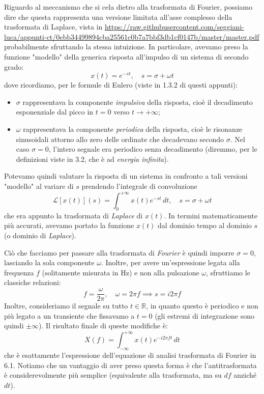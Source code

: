 \documentclass[a4paper,11pt]{article}
\begin{document}
\par\smallskip

Riguardo al meccanismo che si cela dietro alla trasformata di Fourier, possiamo dire che questa rappresenta una versione limitata all'asse complesso della trasformata di Laplace, vista in \url{https://raw.githubusercontent.com/seggiani-luca/appunti-ct/0ebb34499894cba25561c0b7a7bbf3db1cf0147b/master/master.pdf} probabilmente sfruttando la stessa intuizione. 
In particolare, avevamo preso la funzione "modello" della generica risposta all'impulso di un sistema di secondo grado:
$$
x(t) = e^{-st}, \quad s = \sigma + \omega t
$$
dove ricordiamo, per le formule di Eulero (viste in 1.3.2 di questi appunti):
\begin{itemize}
	\item $\sigma$ rappresentava la componente \textit{impulsiva} della risposta, cioè il decadimento esponenziale dal picco in $t = 0$ verso $t \rightarrow +\infty$;
	\item $\omega$ rappresentava la componente \textit{periodica} della risposta, cioè le risonanze sinusoidali attorno allo zero delle ordinate che decadevano secondo $\sigma$. Nel caso $\sigma = 0$, l'intero segnale era periodico senza decadimento (diremmo, per le definizioni viste in 3.2, che è ad \textit{energia infinita}).
\end{itemize}

Potevamo quindi valutare la risposta di un sistema in confronto a tali versioni "modello" al variare di $s$ prendendo l'integrale di convoluzione  
$$
\mathcal{L}[x(t)](s) = \int_0^{+\infty} x(t) e^{-st} \, dt, \quad s = \sigma + \omega t
$$
che era appunto la trasformata di \textit{Laplace} di $x(t)$. In termini matematicamente più accurati, avevamo portato la funzione $x(t)$ dal dominio tempo al dominio $s$ (o dominio di \textit{Laplace}).

Ciò che facciamo per passare alla trasformata di \textit{Fourier} è quindi imporre $\sigma = 0$, lasciando la sola componente $\omega$. Inoltre, per avere un'espressione legata alla frequenza $f$ (solitamente misurata in $\mathrm{Hz}$) e non alla pulsazione $\omega$, sfruttiamo le classiche relazioni:
$$
f = \frac{\omega}{2 \pi}, \quad \omega = 2 \pi f \implies s = i 2 \pi f
$$
Inoltre, consideriamo il segnale su tutto $t \in \mathbb{R}$, in quanto questo è periodico e non più legato a un transiente che fissavamo a $t = 0$ (gli estremi di integrazione sono quindi $\pm \infty$). Il risultato finale di queste modifiche è:
$$
X(f) = \int_{-\infty}^{+\infty} x(t) e^{-i 2 \pi f t} \, dt 
$$
che è esattamente l'espressione dell'equazione di analisi trasformata di Fourier in 6.1. Notiamo che un vantaggio di aver preso questa forma è che l'antitrasformata è considerevolmente più semplice (equivalente alla trasformata, ma su $df$ anziché $dt$).
\end{document}
